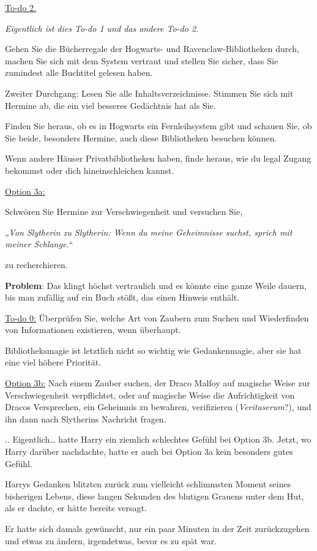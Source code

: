 {\uline{To-do 2.}

\emph{Eigentlich ist dies To-do 1 und das andere To-do 2.}

Gehen Sie die Bücherregale der Hogwarts- und Ravenclaw-Bibliotheken durch, machen Sie sich mit dem System vertraut und stellen Sie sicher, dass Sie zumindest alle Buchtitel gelesen haben.

Zweiter Durchgang: Lesen Sie alle Inhaltsverzeichnisse. Stimmen Sie sich mit Hermine ab, die ein viel besseres Gedächtnis hat als Sie.

Finden Sie heraus, ob es in Hogwarts ein Fernleihsystem gibt und schauen Sie, ob Sie beide, besonders Hermine, auch diese Bibliotheken besuchen können.

Wenn andere Häuser Privatbibliotheken haben, finde heraus, wie du legal Zugang bekommst oder dich hineinschleichen kannst.

\uline{Option 3a:}

Schwören Sie Hermine zur Verschwiegenheit und versuchen Sie,

„\emph{Von Slytherin zu Slytherin: Wenn du meine Geheimnisse suchst, sprich mit meiner Schlange.}“

zu recherchieren.

\textbf{Problem}: Das klingt höchst vertraulich und es könnte eine ganze Weile dauern, bis man zufällig auf ein Buch stößt, das einen Hinweis enthält.

\uline{To-do 0:} Überprüfen Sie, welche Art von Zaubern zum Suchen und Wiederfinden von Informationen existieren, wenn überhaupt.

Bibliotheksmagie ist letztlich nicht so wichtig wie Gedankenmagie, aber sie hat eine viel höhere Priorität.

\uline{Option 3b:} Nach einem Zauber suchen, der Draco Malfoy auf magische Weise zur Verschwiegenheit verpflichtet, oder auf magische Weise die Aufrichtigkeit von Dracos Versprechen, ein Geheimnis zu bewahren, verifizieren (\emph{Veritaserum}?), und ihn dann nach Slytherins Nachricht fragen.

.. Eigentlich… hatte Harry ein ziemlich schlechtes Gefühl bei Option 3b. Jetzt, wo Harry darüber nachdachte, hatte er auch bei Option 3a kein besonders gutes Gefühl.

Harrys Gedanken blitzten zurück zum vielleicht schlimmsten Moment seines bisherigen Lebens, diese langen Sekunden des blutigen Grauens unter dem Hut, als er dachte, er hätte bereits versagt.

Er hatte sich damals gewünscht, nur ein paar Minuten in der Zeit zurückzugehen und etwas zu ändern, irgendetwas, bevor es zu spät war.

}
